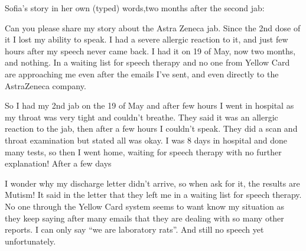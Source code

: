 Sofia's story in her own (typed) words,two months after the second jab:

Can you please share my story about the Astra Zeneca jab. Since the 2nd dose of
it I lost my ability to speak. I had a severe allergic reaction to it, and just
few hours after my speech never came back. I had it on 19 of May, now two
months, and nothing. In a waiting list for speech therapy and no one from Yellow
Card are approaching me even after the emails I've sent, and even directly to
the AstraZeneca company.

So I had my 2nd jab on the 19 of May and after few hours I went in hospital as
my throat was very tight and couldn't breathe. They said it was an allergic
reaction to the jab, then after a few hours I couldn't speak. They did a scan
and throat examination but stated all was okay. I was 8 days in hospital and
done many tests, so then I went home, waiting for speech therapy with no further
explanation! After a few days

I wonder why my discharge letter didn't arrive, so when ask for it, the results
are Mutism! It said in the letter that they left me in a waiting list for speech
therapy. No one through the Yellow Card system seems to want know my situation
as they keep saying after many emails that they are dealing with so many other
reports.  I can only say ``we are laboratory rats''.  And still no speech yet
unfortunately.

